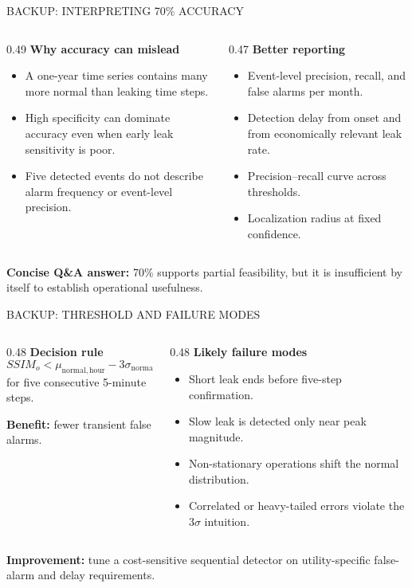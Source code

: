\documentclass[10pt]{beamer}
\newcommand{\DenseBullets}[1]{%
  \begin{itemize}
    \setlength{\itemsep}{0.045in}
    \setlength{\parskip}{0pt}
    #1
  \end{itemize}
}
\begin{document}
\begin{SWNFrame}{BACKUP: INTERPRETING 70\% ACCURACY}
\begin{columns}[T,onlytextwidth]
\begin{column}{0.49\textwidth}
\textbf{Why accuracy can mislead}
\DenseBullets{
  \item A one-year time series contains many more normal than leaking time steps.
  \item High specificity can dominate accuracy even when early leak sensitivity is poor.
  \item Five detected events do not describe alarm frequency or event-level precision.
}
\end{column}
\begin{column}{0.47\textwidth}
\textbf{Better reporting}
\DenseBullets{
  \item Event-level precision, recall, and false alarms per month.
  \item Detection delay from onset and from economically relevant leak rate.
  \item Precision--recall curve across thresholds.
  \item Localization radius at fixed confidence.
}
\end{column}
\end{columns}
\vspace{0.10in}
\textbf{Concise Q\&A answer:} 70\% supports partial feasibility, but it is insufficient by itself to establish operational usefulness.
\end{SWNFrame}

\begin{SWNFrame}{BACKUP: THRESHOLD AND FAILURE MODES}
\begin{columns}[T,onlytextwidth]
\begin{column}{0.48\textwidth}
\textbf{Decision rule}
\[
SSIM_o < \mu_{\mathrm{normal,hour}}-3\sigma_{\mathrm{normal,hour}}
\]
for five consecutive 5-minute steps.

\textbf{Benefit:} fewer transient false alarms.
\end{column}
\begin{column}{0.48\textwidth}
\textbf{Likely failure modes}
\DenseBullets{
  \item Short leak ends before five-step confirmation.
  \item Slow leak is detected only near peak magnitude.
  \item Non-stationary operations shift the normal distribution.
  \item Correlated or heavy-tailed errors violate the $3\sigma$ intuition.
}
\end{column}
\end{columns}
\vspace{0.10in}
\textbf{Improvement:} tune a cost-sensitive sequential detector on utility-specific false-alarm and delay requirements.
\end{SWNFrame}
\end{document}

